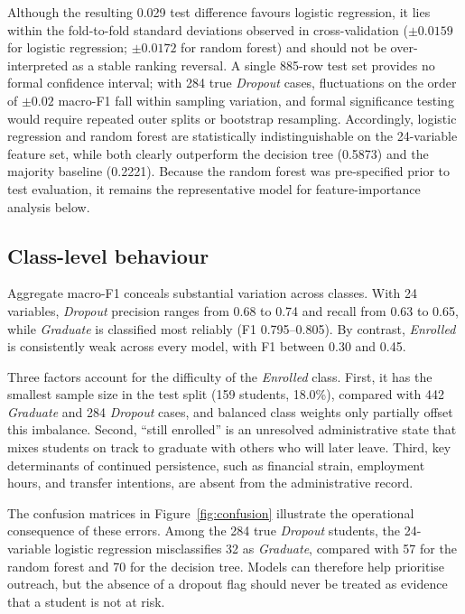 \documentclass[11pt,a4paper]{article}
\newcommand{\Dropout}{\textit{Dropout}}
\newcommand{\Enrolled}{\textit{Enrolled}}
\newcommand{\Graduate}{\textit{Graduate}}
\begin{document}
Although the resulting 0.029 test difference favours logistic regression, it lies within the
fold-to-fold standard deviations observed in cross-validation ($\pm 0.0159$ for logistic regression;
$\pm 0.0172$ for random forest) and should not be over-interpreted as a stable ranking reversal. A
single 885-row test set provides no formal confidence interval; with 284 true \Dropout{} cases,
fluctuations on the order of $\pm 0.02$ macro-F1 fall within sampling variation, and formal
significance testing would require repeated outer splits or bootstrap resampling. Accordingly,
logistic regression and random forest are statistically indistinguishable on the 24-variable feature
set, while both clearly outperform the decision tree (0.5873) and the majority baseline (0.2221).
Because the random forest was pre-specified prior to test evaluation, it remains the representative
model for feature-importance analysis below.

\subsection{Class-level behaviour}

Aggregate macro-F1 conceals substantial variation across classes. With 24 variables, \Dropout{}
precision ranges from 0.68 to 0.74 and recall from 0.63 to 0.65, while \Graduate{} is classified
most reliably (F1 0.795--0.805). By contrast, \Enrolled{} is consistently weak across every model,
with F1 between 0.30 and 0.45.

Three factors account for the difficulty of the \Enrolled{} class. First, it has the smallest sample
size in the test split (159 students, 18.0\%), compared with 442 \Graduate{} and 284 \Dropout{}
cases, and balanced class weights only partially offset this imbalance. Second, ``still enrolled''
is an unresolved administrative state that mixes students on track to graduate with others who will
later leave. Third, key determinants of continued persistence, such as financial strain, employment
hours, and transfer intentions, are absent from the administrative record.

The confusion matrices in Figure~\ref{fig:confusion} illustrate the operational consequence of these
errors. Among the 284 true \Dropout{} students, the 24-variable logistic regression misclassifies 32
as \Graduate{}, compared with 57 for the random forest and 70 for the decision tree. Models can
therefore help prioritise outreach, but the absence of a dropout flag should never be treated as
evidence that a student is not at risk.
\end{document}
